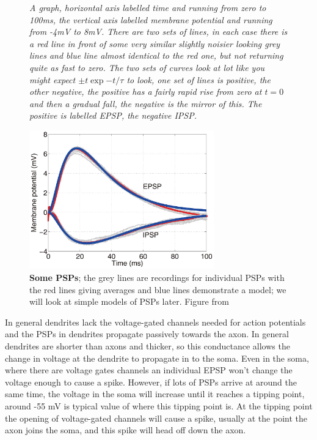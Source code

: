 \documentclass[12pt]{article}
\begin{document}
\begin{figure}[tbhp]
{\textsl{A graph, horizontal axis labelled time and running from zero to 100ms, the vertical axis labelled membrane potential and running from -4mV to 8mV. There are two sets of lines, in each case there is a red line in front of some very similar slightly noisier looking grey lines and blue line almost identical to the red one, but not returning quite as fast to zero. The two sets of curves look at lot like you might expect $\pm t\exp{-t/\tau}$ to look, one set of lines is positive, the other negative, the positive has a fairly rapid rise from zero at $t=0$ and then a gradual fall, the negative is the mirror of this. The positive is labelled EPSP, the negative IPSP. }}
{
  \begin{center}
    \includegraphics[width=8cm]{psp.jpg}
  \end{center}
  }
  \caption{\textbf{Some PSPs}; the grey lines are recordings for
    individual PSPs with the red lines giving averages and blue lines
    demonstrate a model; we will look at simple models of PSPs
    later. Figure from \cite{ZhouEtAl2013}\label{fig_psp}}
\end{figure}

In general dendrites lack the voltage-gated channels needed for action
potentials and the PSPs in dendrites propagate passively towards the
axon. In general dendrites are shorter than axons and thicker, so this
conductance allows the change in voltage at the dendrite to propagate
in to the soma. Even in the soma, where there are voltage gates
channels an individual EPSP won't change the voltage enough to cause a
spike. However, if lots of PSPs arrive at around the same time, the
voltage in the soma will increase until it reaches a tipping point,
around -55 mV is typical value of where this tipping point is. At the tipping point
the opening of voltage-gated channels will cause a spike, usually at
the point the axon joins the soma, and this spike will head off down
the axon.
\end{document}
